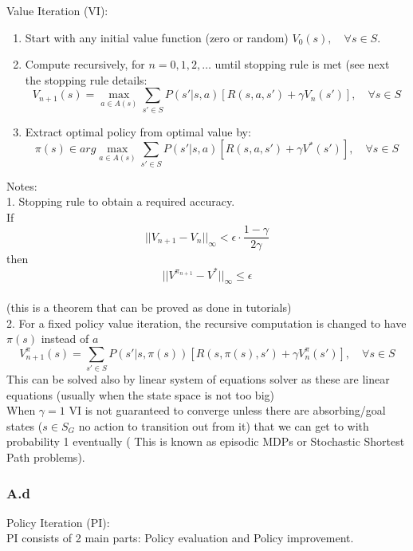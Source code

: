 \documentclass[12pt]{article}
\begin{document}
Value Iteration (VI):\\

\begin{enumerate}
  \item Start with any initial value function (zero or random) $V_0(s),\quad \forall s\in S$.
  \item Compute recursively, for $n = 0,1,2, \ldots $ umtil stopping rule is met (see next the stopping rule details:
          \[V_{n + 1}(s) = \max_{a\in A(s)} \sum_{s' \in S} P(s'|s,a)[R(s,a,s') + \gamma V_n(s')], \quad \forall s \in S\]
   \item Extract optimal policy from optimal value by:
   \[\pi(s) \in arg\max_{a\in A(s)} \sum_{s' \in S} P(s'|s,a)[R(s,a,s') + \gamma V^*(s')], \quad \forall s \in S\]
\end{enumerate}
Notes:\\
1. Stopping rule to obtain a required accuracy.\\
  If $$||V_{n+1}-V_{n}||_\infty < \epsilon \cdot \frac{1-\gamma}{2\gamma}$$ then $$||V^{\pi_{n+1}} -
V^{*}||_\infty \leq \epsilon$$\\
(this is a theorem that can be proved as done in tutorials)\\
2. For a fixed policy value iteration, the recursive computation is changed to have $\pi(s)$ instead of $a$
$$V^{\pi}_{n + 1}(s) = \sum_{s' \in S} P(s'|s,\pi(s))[R(s,\pi(s),s') + \gamma V^{\pi}_n(s')], \quad \forall s \in S$$
This can be solved also by linear system of equations solver as these are linear equations (usually when the state space is not too big)\\

When $\gamma=1$ VI is not guaranteed to converge unless there are absorbing/goal states ($s\in S_G$ no action to transition out from it) that we can get to with probability 1 eventually ( This is known as episodic MDPs or Stochastic Shortest Path problems).

\subsubsection*{A.d}

Policy Iteration (PI):\\
PI consists of 2 main parts: Policy evaluation and Policy improvement.
\end{document}
